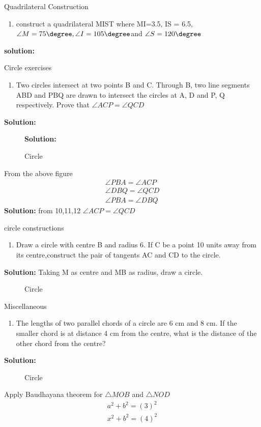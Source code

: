 \documentclass{beamer}
\newcounter{saveenumi}
\newcommand{\seti}{\setcounter{saveenumi}{\value{enumi}}}
\newcommand{\conti}{\setcounter{enumi}{\value{saveenumi}}}
\begin{document}
\begin{frame}{Quadrilateral Construction}
\begin{enumerate}
\conti
\item construct a quadrilateral MIST where MI=3.5, IS = 6.5, $\angle{M} = 75\degree , \angle{I} = 105\degree $and $\angle{S} =120\degree$
\seti
\end{enumerate}
\textbf{solution:}
\end{frame}
\begin{frame}{Circle exercises}
\begin{enumerate}
\conti
\item Two circles intersect at two points B and C.
Through B, two line segments ABD and PBQ
are drawn to intersect the circles at A, D and
P, Q respectively. Prove that $\angle{ACP}=\angle{QCD}$
\seti
\end{enumerate}
\textbf{Solution:}
\begin{figure}[!ht]
\resizebox{0.2\linewidth}{!}{}
\caption{Circle}
\label{fig:foo}\textbf{Solution:} 
\end{figure}
From the above figure
\begin{align}
\angle{PBA}=\angle{ACP}\\
\angle{DBQ}=\angle{QCD}\\
\angle{PBA}=\angle{DBQ}
\end{align}\textbf{Solution:} 
from 10,11,12 $\angle{ACP}=\angle{QCD}$
\end{frame}
\begin{frame}{circle constructions}
\begin{enumerate}
\conti 
\item Draw a circle with centre B and radius 6. If C be a point 10 units away from its centre,construct the pair of tangents AC and CD to
the circle.
\seti
\end{enumerate}
\textbf{Solution:} Taking M as centre and MB as radius, draw a circle. 
\begin{figure}[!ht]
\resizebox{0.45\linewidth}{!}{}
\caption{Circle}
\label{fig:foo}
\end{figure}
\end{frame}
\begin{frame}

\end{frame}
\begin{frame}{Miscellaneous}
\begin{enumerate}
\conti
\item The lengths of two parallel chords of a circle are 6 cm and 8 cm. If the smaller chord is
at distance 4 cm from the centre, what is the
distance of the other chord from the centre?
\end{enumerate}
\textbf{Solution:} 
\begin{figure}[!ht]
\resizebox{0.45\linewidth}{!}{}
\caption{Circle}
\label{fig:foo}
\end{figure}
\end{frame}
\begin{frame}
Apply Baudhayana theorem for $\triangle{MOB}$ and $\triangle{NOD}$
\begin{align*}
a^2+b^2=(3)^2 \\
x^2+b^2=(4)^2
\end{align*}

\end{frame}
\end{document}
